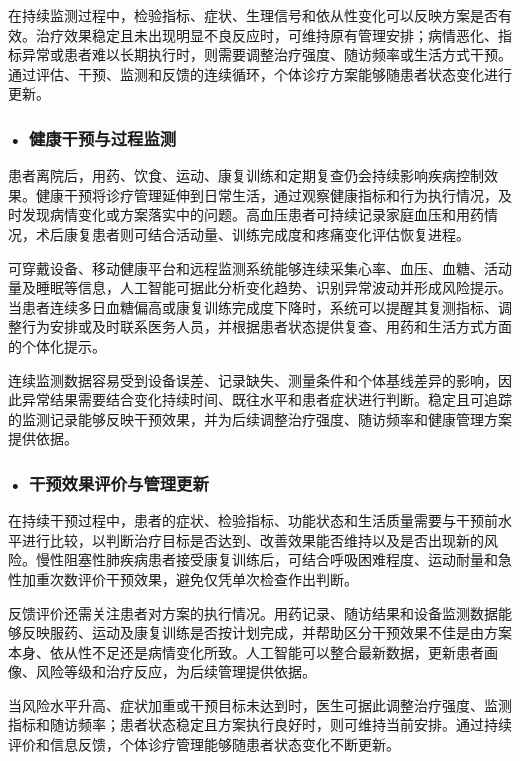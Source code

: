在持续监测过程中，检验指标、症状、生理信号和依从性变化可以反映方案是否有效。治疗效果稳定且未出现明显不良反应时，可维持原有管理安排；病情恶化、指标异常或患者难以长期执行时，则需要调整治疗强度、随访频率或生活方式干预。通过评估、干预、监测和反馈的连续循环，个体诊疗方案能够随患者状态变化进行更新。

\subsubsection*{\textbf{• 健康干预与过程监测}}

患者离院后，用药、饮食、运动、康复训练和定期复查仍会持续影响疾病控制效果。健康干预将诊疗管理延伸到日常生活，通过观察健康指标和行为执行情况，及时发现病情变化或方案落实中的问题。高血压患者可持续记录家庭血压和用药情况，术后康复患者则可结合活动量、训练完成度和疼痛变化评估恢复进程。

可穿戴设备、移动健康平台和远程监测系统能够连续采集心率、血压、血糖、活动量及睡眠等信息，人工智能可据此分析变化趋势、识别异常波动并形成风险提示。当患者连续多日血糖偏高或康复训练完成度下降时，系统可以提醒其复测指标、调整行为安排或及时联系医务人员，并根据患者状态提供复查、用药和生活方式方面的个体化提示。

连续监测数据容易受到设备误差、记录缺失、测量条件和个体基线差异的影响，因此异常结果需要结合变化持续时间、既往水平和患者症状进行判断。稳定且可追踪的监测记录能够反映干预效果，并为后续调整治疗强度、随访频率和健康管理方案提供依据。


\subsubsection*{\textbf{• 干预效果评价与管理更新}}

在持续干预过程中，患者的症状、检验指标、功能状态和生活质量需要与干预前水平进行比较，以判断治疗目标是否达到、改善效果能否维持以及是否出现新的风险。慢性阻塞性肺疾病患者接受康复训练后，可结合呼吸困难程度、运动耐量和急性加重次数评价干预效果，避免仅凭单次检查作出判断。

反馈评价还需关注患者对方案的执行情况。用药记录、随访结果和设备监测数据能够反映服药、运动及康复训练是否按计划完成，并帮助区分干预效果不佳是由方案本身、依从性不足还是病情变化所致。人工智能可以整合最新数据，更新患者画像、风险等级和治疗反应，为后续管理提供依据。

当风险水平升高、症状加重或干预目标未达到时，医生可据此调整治疗强度、监测指标和随访频率；患者状态稳定且方案执行良好时，则可维持当前安排。通过持续评价和信息反馈，个体诊疗管理能够随患者状态变化不断更新。

